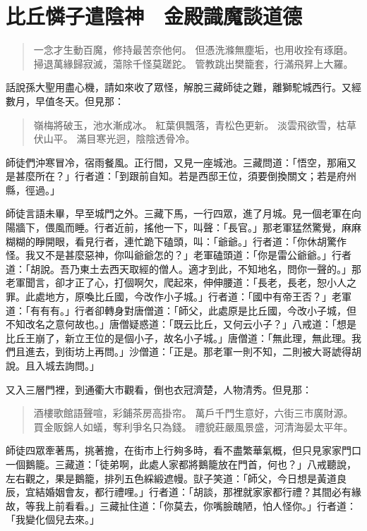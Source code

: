 
\chapter{比丘憐子遣陰神　金殿識魔談道德}

\begin{quote}
一念才生動百魔，修持最苦奈他何。
但憑洗滌無塵垢，也用收拴有琢磨。
掃退萬緣歸寂滅，蕩除千怪莫蹉跎。
管教跳出樊籠套，行滿飛昇上大羅。
\end{quote}

話說孫大聖用盡心機，請如來收了眾怪，解脫三藏師徒之難，離獅駝城西行。又經數月，早值冬天。但見那：
\begin{quote}
嶺梅將破玉，池水漸成冰。
紅葉俱飄落，青松色更新。
淡雲飛欲雪，枯草伏山平。
滿目寒光迥，陰陰透骨冷。
\end{quote}

師徒們沖寒冒冷，宿雨餐風。正行間，又見一座城池。三藏問道：「悟空，那廂又是甚麼所在？」行者道：「到跟前自知。若是西邸王位，須要倒換關文；若是府州縣，徑過。」

師徒言語未畢，早至城門之外。三藏下馬，一行四眾，進了月城。見一個老軍在向陽牆下，偎風而睡。行者近前，搖他一下，叫聲：「長官。」那老軍猛然驚覺，麻麻糊糊的睜開眼，看見行者，連忙跪下磕頭，叫：「爺爺。」行者道：「你休胡驚作怪。我又不是甚麼惡神，你叫爺爺怎的？」老軍磕頭道：「你是雷公爺爺。」行者道：「胡說。吾乃東土去西天取經的僧人。適才到此，不知地名，問你一聲的。」那老軍聞言，卻才正了心，打個啊欠，爬起來，伸伸腰道：「長老，長老，恕小人之罪。此處地方，原喚比丘國，今改作小子城。」行者道：「國中有帝王否？」老軍道：「有有有。」行者卻轉身對唐僧道：「師父，此處原是比丘國，今改小子城，但不知改名之意何故也。」唐僧疑惑道：「既云比丘，又何云小子？」八戒道：「想是比丘王崩了，新立王位的是個小子，故名小子城。」唐僧道：「無此理，無此理。我們且進去，到街坊上再問。」沙僧道：「正是。那老軍一則不知，二則被大哥諕得胡說。且入城去詢問。」

又入三層門裡，到通衢大市觀看，倒也衣冠濟楚，人物清秀。但見那：
\begin{quote}
酒樓歌館語聲喧，彩鋪茶房高掛帘。
萬戶千門生意好，六街三市廣財源。
買金販錦人如蟻，奪利爭名只為錢。
禮貌莊嚴風景盛，河清海晏太平年。
\end{quote}

師徒四眾牽著馬，挑著擔，在街市上行夠多時，看不盡繁華氣概，但只見家家門口一個鵝籠。三藏道：「徒弟啊，此處人家都將鵝籠放在門首，何也？」八戒聽說，左右觀之，果是鵝籠，排列五色綵緞遮幔。獃子笑道：「師父，今日想是黃道良辰，宜結婚姻會友，都行禮哩。」行者道：「胡談，那裡就家家都行禮？其間必有緣故，等我上前看看。」三藏扯住道：「你莫去，你嘴臉醜陋，怕人怪你。」行者道：「我變化個兒去來。」

